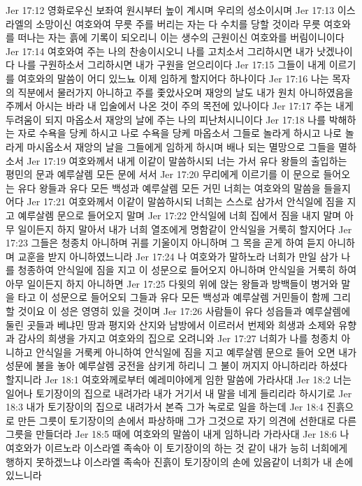 Jer 17:12  영화로우신 보좌여 원시부터 높이 계시며 우리의 성소이시며
Jer 17:13  이스라엘의 소망이신 여호와여 무릇 주를 버리는 자는 다 수치를 당할 것이라 무릇 여호와를 떠나는 자는 흙에 기록이 되오리니 이는 생수의 근원이신 여호와를 버림이니이다
Jer 17:14  여호와여 주는 나의 찬송이시오니 나를 고치소서 그리하시면 내가 낫겠나이다 나를 구원하소서 그리하시면 내가 구원을 얻으리이다
Jer 17:15  그들이 내게 이르기를 여호와의 말씀이 어디 있느뇨 이제 임하게 할지어다 하나이다
Jer 17:16  나는 목자의 직분에서 물러가지 아니하고 주를 좇았사오며 재앙의 날도 내가 원치 아니하였음을 주께서 아시는 바라 내 입술에서 나온 것이 주의 목전에 있나이다
Jer 17:17  주는 내게 두려움이 되지 마옵소서 재앙의 날에 주는 나의 피난처시니이다
Jer 17:18  나를 박해하는 자로 수욕을 당케 하시고 나로 수욕을 당케 마옵소서 그들로 놀라게 하시고 나로 놀라게 마시옵소서 재앙의 날을 그들에게 임하게 하시며 배나 되는 멸망으로 그들을 멸하소서
Jer 17:19  여호와께서 내게 이같이 말씀하시되 너는 가서 유다 왕들의 출입하는 평민의 문과 예루살렘 모든 문에 서서
Jer 17:20  무리에게 이르기를 이 문으로 들어오는 유다 왕들과 유다 모든 백성과 예루살렘 모든 거민 너희는 여호와의 말씀을 들을지어다
Jer 17:21  여호와께서 이같이 말씀하시되 너희는 스스로 삼가서 안식일에 짐을 지고 예루살렘 문으로 들어오지 말며
Jer 17:22  안식일에 너희 집에서 짐을 내지 말며 아무 일이든지 하지 말아서 내가 너희 열조에게 명함같이 안식일을 거룩히 할지어다
Jer 17:23  그들은 청종치 아니하며 귀를 기울이지 아니하며 그 목을 곧게 하여 듣지 아니하며 교훈을 받지 아니하였느니라
Jer 17:24  나 여호와가 말하노라 너희가 만일 삼가 나를 청종하여 안식일에 짐을 지고 이 성문으로 들어오지 아니하며 안식일을 거룩히 하여 아무 일이든지 하지 아니하면
Jer 17:25  다윗의 위에 앉는 왕들과 방백들이 병거와 말을 타고 이 성문으로 들어오되 그들과 유다 모든 백성과 예루살렘 거민들이 함께 그리할 것이요 이 성은 영영히 있을 것이며
Jer 17:26  사람들이 유다 성읍들과 예루살렘에 둘린 곳들과 베냐민 땅과 평지와 산지와 남방에서 이르러서 번제와 희생과 소제와 유향과 감사의 희생을 가지고 여호와의 집으로 오려니와
Jer 17:27  너희가 나를 청종치 아니하고 안식일을 거룩케 아니하여 안식일에 짐을 지고 예루살렘 문으로 들어 오면 내가 성문에 불을 놓아 예루살렘 궁전을 삼키게 하리니 그 불이 꺼지지 아니하리라 하셨다 할지니라
Jer 18:1  여호와께로부터 예레미야에게 임한 말씀에 가라사대
Jer 18:2  너는 일어나 토기장이의 집으로 내려가라 내가 거기서 내 말을 네게 들리리라 하시기로
Jer 18:3  내가 토기장이의 집으로 내려가서 본즉 그가 녹로로 일을 하는데
Jer 18:4  진흙으로 만든 그릇이 토기장이의 손에서 파상하매 그가 그것으로 자기 의견에 선한대로 다른 그릇을 만들더라
Jer 18:5  때에 여호와의 말씀이 내게 임하니라 가라사대
Jer 18:6  나 여호와가 이르노라 이스라엘 족속아 이 토기장이의 하는 것 같이 내가 능히 너희에게 행하지 못하겠느냐 이스라엘 족속아 진흙이 토기장이의 손에 있음같이 너희가 내 손에 있느니라

